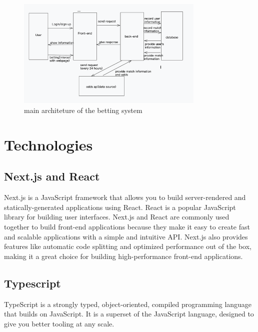 \documentclass[singlecolumn]{article}
\begin{document}
\begin{figure}[H]
    \centering
    \includegraphics[width=0.8\textwidth]{architecture.png}
    \caption{main architeture of the betting system}
    \label{fig:architecture}
\end{figure}



\section{Technologies}
\subsection{Next.js and React}

Next.js is a JavaScript framework that allows you to build server-rendered and statically-generated applications using React. React is a popular JavaScript library for building user interfaces. Next.js and React are commonly used together to build front-end applications because they make it easy to create fast and scalable applications with a simple and intuitive API. Next.js also provides features like automatic code splitting and optimized performance out of the box, making it a great choice for building high-performance front-end applications.

\subsection{Typescript}
TypeScript is a strongly typed, object-oriented, compiled programming language that builds on JavaScript. It is a superset of the JavaScript language, designed to give you better tooling at any scale.
\end{document}
